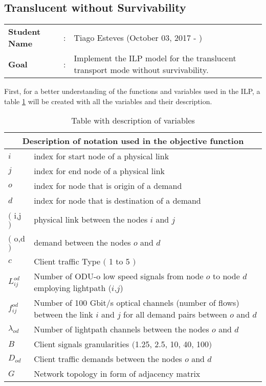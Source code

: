 \clearpage

\subsection{Translucent without Survivability}\label{ILP_Transluc_Survivability}
\begin{tcolorbox}	
\begin{tabular}{p{2.75cm} p{0.2cm} p{10.5cm}} 	
\textbf{Student Name}  &:& Tiago Esteves    (October 03, 2017 - )\\
\textbf{Goal}          &:& Implement the ILP model for the translucent transport mode without survivability.
\end{tabular}
\end{tcolorbox}
\vspace{11pt}

First, for a better understanding of the functions and variables used in the ILP, a table \ref{description_transluc} will be created with all the variables and their description. \\

\begin{table}[h!]
\centering
\begin{tabular}{ |p{1cm}||p{13cm}|}
 \hline
 \multicolumn{2}{|c|}{Description of notation used in the objective function} \\
 \hline
 \hline
 $i$ & index for start node of a physical link \\
 $j$ & index for end node of a physical link \\
 $o$ & index for node that is origin of a demand \\
 $d$ & index for node that is destination of a demand \\
 $($ i,j $)$ & physical link between the nodes $i$ and $j$ \\
 $($ o,d $)$ & demand between the nodes $o$ and $d$ \\
 $c$ & Client traffic Type $($ 1 to 5 $)$ \\
 $L_{ij}^{od}$ & Number of ODU-o low speed signals from node $o$ to node $d$ employing lightpath ($i$,$j$) \\
 $f_{ij}^{od}$ & Number of 100 Gbit/s optical channels (number of flows) between the link $i$ and $j$ for all demand pairs between $o$ and $d$ \\
 $\lambda_{od}$ & Number of lightpath channels between the nodes $o$ and $d$ \\
 $B$ & Client signals granularities $($1.25, 2.5, 10, 40, 100$)$ \\
 $D_{od}$ & Client traffic demands between the nodes $o$ and $d$ \\
 $G$ & Network topology in form of adjacency matrix \\
 \hline
\end{tabular}
\caption{Table with description of variables}
\label{description_transluc}
\end{table}

